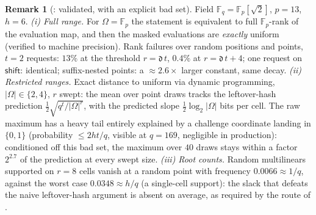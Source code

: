 \documentclass{article}
\newcommand{\Fp}{\mathbb{F}_p}
\newcommand{\Fq}{\mathbb{F}_q}
\newcommand{\extdeg}{\mathfrak{d}}
\theoremstyle{definition}
\newtheorem{remark}[theorem]{Remark}
\begin{document}
\begin{remark}[: validated, with an explicit bad set]\label{rem:numA}
Field $\Fq = \Fp[\sqrt{2}]$, $p = 13$, $h = 6$. \emph{(i) Full range.} For $\Omega = \Fp$ the statement is equivalent to full $\Fp$-rank of the evaluation map, and then the masked evaluations are \emph{exactly} uniform (verified to machine precision). Rank failures over random positions and points, $t = 2$ requests: $13\%$ at the threshold $r = \extdeg\, t$, $0.4\%$ at $r = \extdeg\, t + 4$; one request on $\mathsf{shift}$: identical; suffix-nested points: a $\approx 2.6\times$ larger constant, same decay. \emph{(ii) Restricted ranges.} Exact distance to uniform via dynamic programming, $|\Omega| \in \{2, 4\}$, $r$ swept: the mean over point draws tracks the leftover-hash prediction $\tfrac12 \sqrt{q^t / |\Omega|^r}$, with the predicted slope $\tfrac12 \log_2 |\Omega|$ bits per cell. The raw maximum has a heavy tail entirely explained by a challenge coordinate landing in $\{0,1\}$ (probability $\leq 2ht/q$, visible at $q = 169$, negligible in production): conditioned off this bad set, the maximum over $40$ draws stays within a factor $2^{2.7}$ of the prediction at every swept size. \emph{(iii) Root counts.} Random multilinears supported on $r = 8$ cells vanish at a random point with frequency $0.0066 \approx 1/q$, against the worst case $0.0348 \approx h/q$ (a single-cell support): the slack that defeats the naive leftover-hash argument is absent on average, as required by the route of .
\end{remark}
\end{document}
